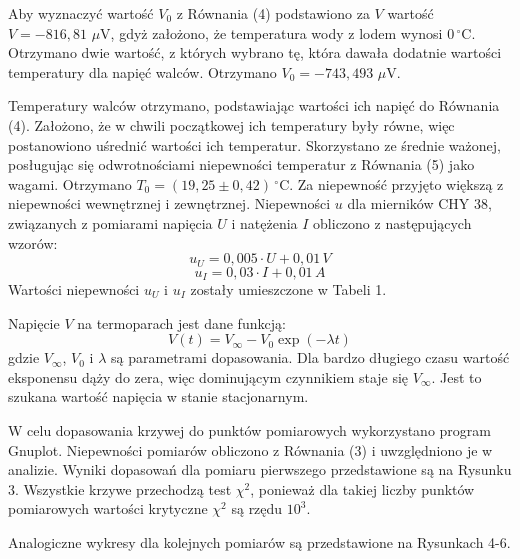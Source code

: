 \documentclass[10pt,a4paper]{article}
\begin{document}
Aby wyznaczyć wartość $V_{0}$ z Równania (4) podstawiono za $V$ wartość $V=-816,81$ $\mu$V, gdyż założono, że temperatura wody z lodem wynosi $0 \,^{\circ}$C. Otrzymano dwie wartość, z których wybrano tę, która dawała dodatnie wartości temperatury dla napięć walców. Otrzymano $V_{0}=-743,493$ $\mu$V. 

Temperatury walców otrzymano, podstawiając wartości ich napięć do Równania (4). Założono, że w chwili początkowej ich temperatury były równe, więc postanowiono uśrednić wartości ich temperatur. Skorzystano ze średnie ważonej, posługując się odwrotnościami niepewności temperatur z Równania (5) jako wagami. Otrzymano $T_{0}=(19,25\pm0,42) \,^{\circ}$C. Za niepewność przyjęto większą z niepewności wewnętrznej i zewnętrznej.
Niepewności $u$ dla mierników CHY 38, związanych z pomiarami napięcia $U$ i natężenia $I$ obliczono z następujących wzorów:
\begin{equation}
u_{U}=0,005\cdot U+0,01 \, V
\end{equation}
\begin{equation}
u_{I}=0,03\cdot I+0,01 \, A
\end{equation}
Wartości niepewności $u_{U}$ i $u_{I}$ zostały umieszczone w Tabeli 1.

Napięcie $V$ na termoparach jest dane funkcją:
\begin{equation}
V(t)=V_{\infty}-V_{0}\exp(-\lambda t)
\end{equation}
gdzie $V_{\infty}$, $V_{0}$ i $\lambda$ są parametrami dopasowania. Dla bardzo długiego czasu wartość eksponensu dąży do zera, więc dominującym czynnikiem staje się $V_{\infty}$. Jest to szukana wartość napięcia w stanie stacjonarnym. 

W celu dopasowania krzywej do punktów pomiarowych wykorzystano program Gnuplot. Niepewności pomiarów obliczono z Równania (3) i uwzględniono je w analizie. Wyniki dopasowań dla pomiaru pierwszego przedstawione są na Rysunku 3.
Wszystkie krzywe przechodzą test $\chi^2$, ponieważ dla takiej liczby punktów pomiarowych wartości krytyczne $\chi^2$ są rzędu $10^3$. 
 
Analogiczne wykresy dla kolejnych pomiarów są przedstawione na Rysunkach 4-6.
\end{document}
